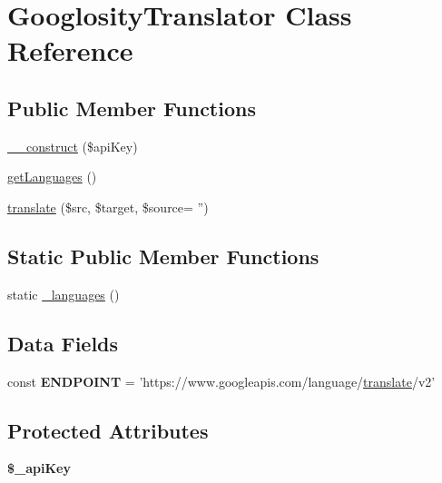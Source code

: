 \hypertarget{class_googlosity_translator}{\section{Googlosity\-Translator Class Reference}
\label{class_googlosity_translator}
}
\subsection*{Public Member Functions}
\begin{DoxyCompactItemize}
\item 
\hyperlink{class_googlosity_translator_a41b639225f0835540c87d74be2018c0f}{\-\_\-\-\_\-construct} (\$api\-Key)
\item 
\hyperlink{class_googlosity_translator_ada2ef7bac2979b90332fe9a527c60667}{get\-Languages} ()
\item 
\hyperlink{class_googlosity_translator_ac1a85a75769194de8af24fa19d5efd17}{translate} (\$src, \$target, \$source= '')
\end{DoxyCompactItemize}
\subsection*{Static Public Member Functions}
\begin{DoxyCompactItemize}
\item 
static \hyperlink{class_googlosity_translator_a4729b97f6facb95dd5c1be71c2d9a914}{\-\_\-languages} ()
\end{DoxyCompactItemize}
\subsection*{Data Fields}
\begin{DoxyCompactItemize}
\item 
\hypertarget{class_googlosity_translator_ae34d152a2aef158ef4191f7d114ba2f5}{const {\bfseries E\-N\-D\-P\-O\-I\-N\-T} = 'https\-://www.\-googleapis.\-com/language/\hyperlink{class_googlosity_translator_ac1a85a75769194de8af24fa19d5efd17}{translate}/v2'}\label{class_googlosity_translator_ae34d152a2aef158ef4191f7d114ba2f5}

\end{DoxyCompactItemize}
\subsection*{Protected Attributes}
\begin{DoxyCompactItemize}
\item 
\hypertarget{class_googlosity_translator_a30d859488ed1921f08a7e8191363d9a4}{{\bfseries \$\-\_\-api\-Key}}\label{class_googlosity_translator_a30d859488ed1921f08a7e8191363d9a4}

\end{DoxyCompactItemize}


